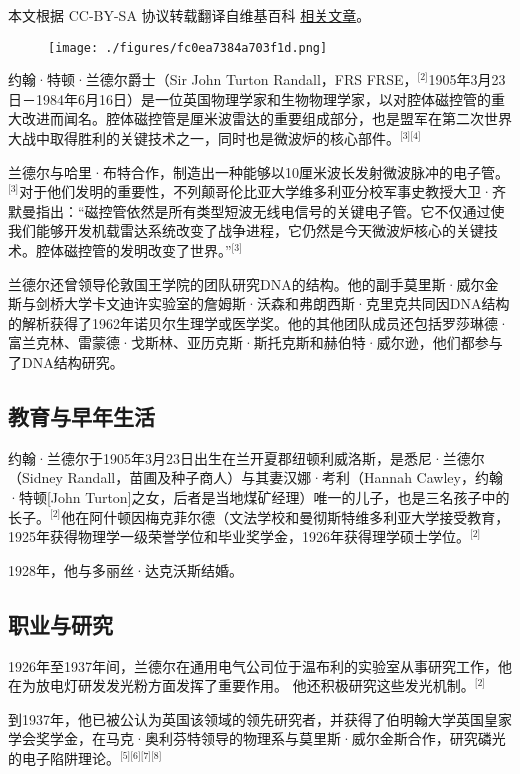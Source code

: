 
本文根据 CC-BY-SA 协议转载翻译自维基百科 \href{https://en.wikipedia.org/wiki/John_Randall_(physicist)}{相关文章}。

\begin{figure}[ht]
\centering
\texttt{[image: ./figures/fc0ea7384a703f1d.png]}
\caption{} \label{fig_YHldr_1}
\end{figure}
约翰·特顿·兰德尔爵士（Sir John Turton Randall，FRS FRSE，\(^\text{[2]}\)1905年3月23日－1984年6月16日）是一位英国物理学家和生物物理学家，以对腔体磁控管的重大改进而闻名。腔体磁控管是厘米波雷达的重要组成部分，也是盟军在第二次世界大战中取得胜利的关键技术之一，同时也是微波炉的核心部件。\(^\text{[3][4]}\)

兰德尔与哈里·布特合作，制造出一种能够以10厘米波长发射微波脉冲的电子管。\(^\text{[3]}\)对于他们发明的重要性，不列颠哥伦比亚大学维多利亚分校军事史教授大卫·齐默曼指出：“磁控管依然是所有类型短波无线电信号的关键电子管。它不仅通过使我们能够开发机载雷达系统改变了战争进程，它仍然是今天微波炉核心的关键技术。腔体磁控管的发明改变了世界。”\(^\text{[3]}\)

兰德尔还曾领导伦敦国王学院的团队研究DNA的结构。他的副手莫里斯·威尔金斯与剑桥大学卡文迪许实验室的詹姆斯·沃森和弗朗西斯·克里克共同因DNA结构的解析获得了1962年诺贝尔生理学或医学奖。他的其他团队成员还包括罗莎琳德·富兰克林、雷蒙德·戈斯林、亚历克斯·斯托克斯和赫伯特·威尔逊，他们都参与了DNA结构研究。
\subsection{教育与早年生活}
约翰·兰德尔于1905年3月23日出生在兰开夏郡纽顿利威洛斯，是悉尼·兰德尔（Sidney Randall，苗圃及种子商人）与其妻汉娜·考利（Hannah Cawley，约翰·特顿[John Turton]之女，后者是当地煤矿经理）唯一的儿子，也是三名孩子中的长子。\(^\text{[2]}\)他在阿什顿因梅克菲尔德（文法学校和曼彻斯特维多利亚大学接受教育，1925年获得物理学一级荣誉学位和毕业奖学金，1926年获得理学硕士学位。\(^\text{[2]}\)

1928年，他与多丽丝·达克沃斯结婚。
\subsection{职业与研究}
1926年至1937年间，兰德尔在通用电气公司位于温布利的实验室从事研究工作，他在为放电灯研发发光粉方面发挥了重要作用。 他还积极研究这些发光机制。\(^\text{[2]}\)

到1937年，他已被公认为英国该领域的领先研究者，并获得了伯明翰大学英国皇家学会奖学金，在马克·奥利芬特领导的物理系与莫里斯·威尔金斯合作，研究磷光的电子陷阱理论。\(^\text{[5][6][7][8]}\)
